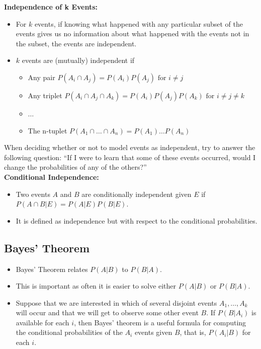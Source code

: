 \documentclass[11pt]{article}
\begin{document}
\textbf{Independence of k Events:}
\begin{itemize}
    \item For $k$ events, if knowing what happened with any particular subset of the events 
    gives us no information about what happened with the events not in the subset, the events
    are independent.
    \item $k$ events are (mutually) independent if 
    \begin{itemize}
        \item Any pair $P(A_i \cap A_j) = P(A_i)P(A_j) \text{ for } i \ne j$ 
        \item Any triplet $P(A_i \cap A_j \cap A_k) = P(A_i)P(A_j)P(A_k) \text{ for } i \ne j 
        \ne k$
        \item $\ldots$
        \item The n-tuplet $P(A_1 \cap \ldots \cap A_n) = P(A_1) \ldots P(A_n) $
    \end{itemize}
\end{itemize}

When deciding whether or not to model events as independent, try to answer the following 
question: ``If I were to learn that some of these events occurred, would I change the 
probabilities of any of the others?'' \\

\textbf{Conditional Independence:}
\begin{itemize}
    \item Two events $A$ and $B$ are conditionally independent given $E$ if $P(A \cap B|E) =
    P(A|E)P(B|E)$.
    \item It is defined as independence but with respect to the conditional probabilities.
\end{itemize}

\subsection{Bayes' Theorem}

\begin{itemize}
    \item Bayes' Theorem relates $P(A|B)$ to $P(B|A)$.
    \item This is important as often it is easier to solve either $P(A|B)$ or $P(B|A)$.
    \item Suppose that we are interested in which of several disjoint events $A_1, \ldots, A_k$
    will occur and that we will get to observe some other event $B$. If $P(B|A_i)$ is available
    for each $i$, then Bayes' theorem is a useful formula for computing the conditional 
    probabilities of the $A_i$ events given $B$, that is, $P(A_i|B)$ for each $i$.
\end{itemize}
\end{document}
